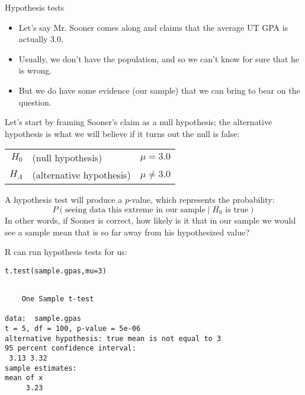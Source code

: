 \documentclass{beamer}\usepackage[]{graphicx}\usepackage[]{color}
\makeatletter
\newcommand{\hlnum}[1]{\textcolor[rgb]{0.824,0.412,0.118}{#1}}%
\newcommand{\hlstd}[1]{\textcolor[rgb]{1,0.894,0.769}{#1}}%
\newcommand{\hlkwc}[1]{\textcolor[rgb]{0.78,0.941,0.545}{#1}}%
\newcommand{\hlkwd}[1]{\textcolor[rgb]{1,0.78,0.769}{#1}}%
\newenvironment{kframe}{%
 \def\at@end@of@kframe{}%
 \ifinner\ifhmode%
  \def\at@end@of@kframe{\end{minipage}}%
  \begin{minipage}{\columnwidth}%
 \fi\fi%
 \def\FrameCommand##1{\hskip\@totalleftmargin \hskip-\fboxsep
 \colorbox{shadecolor}{##1}\hskip-\fboxsep
     \hskip-\linewidth \hskip-\@totalleftmargin \hskip\columnwidth}%
 \MakeFramed {\advance\hsize-\width
   \@totalleftmargin\z@ \linewidth\hsize
   \@setminipage}}%
 {\par\unskip\endMakeFramed%
 \at@end@of@kframe}
\newenvironment{knitrout}{}{} %
\makeatother
\begin{document}
\begin{darkframes}
\begin{frame}{Hypothesis tests}
\begin{itemize}[<+->]
  \item Let's say Mr. Sooner comes along and claims that the average UT GPA is actually 3.0.
  \item Usually, we don't have the population, and so we can't know for sure that he is wrong.
  \item But we do have some evidence (our sample) that we can bring to bear on the question.
\end{itemize}
\end{frame}

\begin{frame}
Let's start by framing Sooner's claim as a null hypothesis; the alternative hypothesis is what we will believe if it turns out the null is false:

\begin{center}
  \begin{tabular}{rl|l}
    $H_0$ & (null hypothesis) & $\mu=3.0$ \\
    $H_A$ & (alternative hypothesis) & $\mu\neq 3.0$
  \end{tabular}
\end{center}
\pause

A hypothesis test will produce a $p$-value, which represents the probability:
\[
  P(\text{seeing data this extreme in our sample} \mid \text{$H_0$ is true})
\]
\pause
In other words, if Sooner is correct, how likely is it that in our sample we would see a sample mean that is so far away from his hypothesized value?
\end{frame}


\begin{frame}[fragile]
R can run hypothesis tests for us:
\begin{knitrout}
\begin{kframe}
\begin{alltt}
\hlkwd{t.test}\hlstd{(sample.gpas,} \hlkwc{mu}\hlstd{=}\hlnum{3}\hlstd{)}
\end{alltt}
\begin{verbatim}

	One Sample t-test

data:  sample.gpas
t = 5, df = 100, p-value = 5e-06
alternative hypothesis: true mean is not equal to 3
95 percent confidence interval:
 3.13 3.32
sample estimates:
mean of x 
     3.23 
\end{verbatim}
\end{kframe}
\end{knitrout}
\end{frame}



\end{darkframes}
\end{document}
